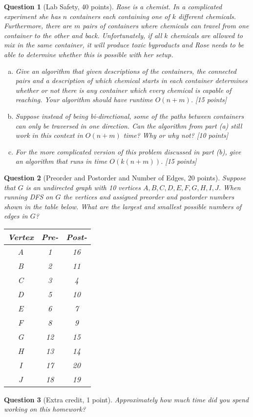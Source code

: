 \documentclass{article}
\newtheorem{ques}{Question}
\begin{document}
\begin{ques}[Lab Safety, 40 points]
Rose is a chemist. In a complicated experiment she has $n$ containers each containing one of $k$ different chemicals. Furthermore, there are $m$ pairs of containers where chemicals can travel from one container to the other and back. Unfortunately, if all $k$ chemicals are allowed to mix in the same container, it will produce toxic byproducts and Rose needs to be able to determine whether this is possible with her setup.
\begin{enumerate}[(a)]
\item Give an algorithm that given descriptions of the containers, the connected pairs and a description of which chemical starts in each container determines whether or not there is any container which every chemical is capable of reaching. Your algorithm should have runtime $O(n+m)$. [15 points]
\item Suppose instead of being bi-directional, some of the paths between containers can only be traversed in one direction. Can the algorithm from part (a) still work in this context in $O(n+m)$ time? Why or why not? [10 points]
\item For the more complicated version of this problem discussed in part (b), give an algorithm that runs in time $O(k(n+m))$. [15 points]
\end{enumerate}
\end{ques}

\begin{ques}[Preorder and Postorder and Number of Edges, 20 points]
Suppose that $G$ is an undirected graph with 10 vertices $A,B,C,D,E,F,G,H,I,J$. When running DFS on $G$ the vertices and assigned preorder and postorder numbers shown in the table below. What are the largest and smallest possible numbers of edges in $G$?
\begin{center}
\begin{tabular}{|c|c|c|}
\hline
Vertex & Pre- & Post- \\
\hline
A&1&16\\
\hline
B&2&11\\
\hline
C&3&4\\
\hline
D&5&10\\
\hline
E&6&7\\
\hline
F&8&9\\
\hline
G&12&15\\
\hline
H&13&14\\
\hline
I&17&20\\
\hline
J&18&19\\
\hline
\end{tabular}
\end{center}
\end{ques}

\begin{ques}[Extra credit, 1 point]
Approximately how much time did you spend working on this homework?
\end{ques}
\end{document}
